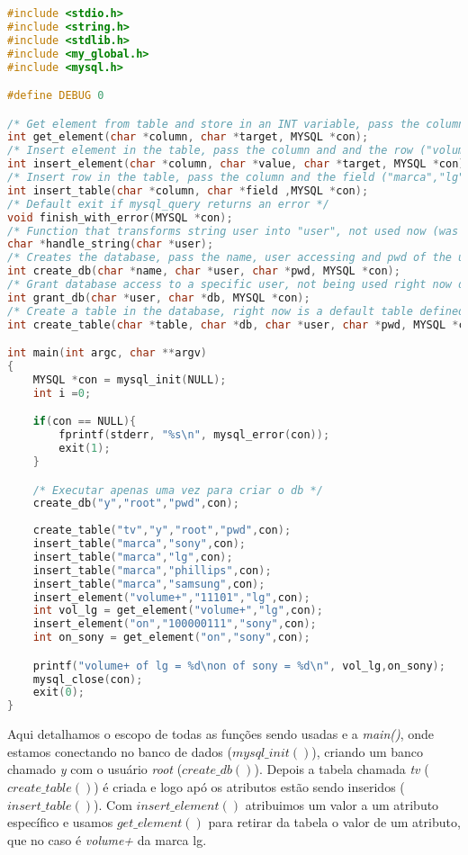 \begin{lstlisting}[language=c, caption={db on c general structure}, label={lst:dbphi1}, basicstyle=\ttfamily\scriptsize]
#include <stdio.h>
#include <string.h>
#include <stdlib.h>
#include <my_global.h>
#include <mysql.h>

#define DEBUG 0

/* Get element from table and store in an INT variable, pass the column and the row ("volume+","sony",con) */
int get_element(char *column, char *target, MYSQL *con);
/* Insert element in the table, pass the column and and the row ("volume+","11111","lg", con) */
int insert_element(char *column, char *value, char *target, MYSQL *con); 
/* Insert row in the table, pass the column and the field ("marca","lg",con) */
int insert_table(char *column, char *field ,MYSQL *con); 
/* Default exit if mysql_query returns an error */
void finish_with_error(MYSQL *con);
/* Function that transforms string user into "user", not used now (was used by grant_db to grant database access to a user) */
char *handle_string(char *user);
/* Creates the database, pass the name, user accessing and pwd of the user ("phi_project","root","pwd",con) */
int create_db(char *name, char *user, char *pwd, MYSQL *con);
/* Grant database access to a specific user, not being used right now due to seg fault. */
int grant_db(char *user, char *db, MYSQL *con);
/* Create a table in the database, right now is a default table defined by the strings on the function */
int create_table(char *table, char *db, char *user, char *pwd, MYSQL *con);

int main(int argc, char **argv)
{
	MYSQL *con = mysql_init(NULL);
	int i =0;

	if(con == NULL){
		fprintf(stderr, "%s\n", mysql_error(con));
		exit(1);
	}

	/* Executar apenas uma vez para criar o db */
	create_db("y","root","pwd",con);
	
	create_table("tv","y","root","pwd",con);
	insert_table("marca","sony",con);
	insert_table("marca","lg",con);
	insert_table("marca","phillips",con);
	insert_table("marca","samsung",con);
	insert_element("volume+","11101","lg",con);
	int vol_lg = get_element("volume+","lg",con);
	insert_element("on","100000111","sony",con);
	int on_sony = get_element("on","sony",con);

	printf("volume+ of lg = %d\non of sony = %d\n", vol_lg,on_sony);
	mysql_close(con);
	exit(0);
}
\end{lstlisting}

Aqui detalhamos o escopo de todas as fun\c{c}\~{o}es sendo usadas e a
\textit{main()}, onde estamos conectando no banco de dados
(\textit{$mysql\_init()$}), criando um banco chamado \textit{y} com o
usu\'{a}rio \textit{root} (\textit{$create\_db()$}). Depois a tabela chamada
\textit{tv} (\textit{$create\_table()$}) \'{e} criada e logo ap\'{o} os
atributos est\~{a}o sendo inseridos (\textit{$insert\_table()$}). Com
\textit{$insert\_element()$} atribuimos um valor a um atributo espec\'{i}fico e
usamos \textit{$get\_element()$} para retirar da tabela o valor de um atributo,
que no caso \'{e} \textit{volume+} da marca lg.

